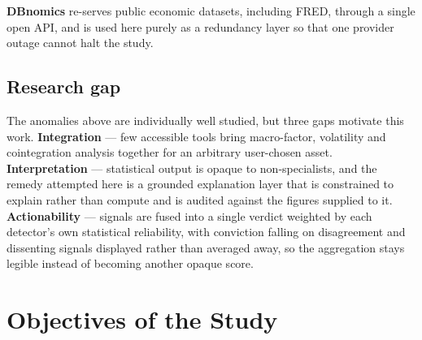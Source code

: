 \documentclass[11pt,a4paper]{article}
\begin{document}
\textbf{DBnomics} re-serves public economic datasets, including FRED, through a single
open API, and is used here purely as a redundancy layer so that one provider outage cannot
halt the study.

\subsection{Research gap}

The anomalies above are individually well studied, but three gaps motivate this work.
\textbf{Integration} --- few accessible tools bring macro-factor, volatility and
cointegration analysis together for an arbitrary user-chosen asset.
\textbf{Interpretation} --- statistical output is opaque to non-specialists, and the remedy
attempted here is a grounded explanation layer that is constrained to explain rather than
compute and is audited against the figures supplied to it. \textbf{Actionability} ---
signals are fused into a single verdict weighted by each detector's own statistical
reliability, with conviction falling on disagreement and dissenting signals displayed
rather than averaged away, so the aggregation stays legible instead of becoming another
opaque score.

\section{Objectives of the Study}
\end{document}
